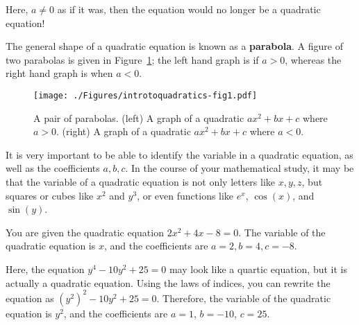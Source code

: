 \documentclass[
  12pt,
  a4paper, oneside]{starmastarticle}
\begin{document}
Here, \(a\neq 0\) as if it was, then the equation would no longer be a
quadratic equation!

The general shape of a quadratic equation is known as a
\textbf{parabola}. A figure of two parabolas is given in
Figure~\ref{fig-1}; the left hand graph is if \(a > 0\), whereas the
right hand graph is when \(a < 0\).

\begin{figure}

{\centering \texttt{[image: ./Figures/introtoquadratics-fig1.pdf]}

}

\caption{\label{fig-1}A pair of parabolas. (left) A graph of a quadratic
\(ax^2 + bx + c\) where \(a > 0\). (right) A graph of a quadratic
\(ax^2 + bx + c\) where \(a < 0\).}

\end{figure}

It is very important to be able to identify the variable in a quadratic
equation, as well as the coefficients \(a,b,c\). In the course of your
mathematical study, it may be that the variable of a quadratic equation
is not only letters like \(x,y,z\), but squares or cubes like \(x^2\)
and \(y^3\), or even functions like \(e^x\), \(\cos(x)\), and
\(\sin(y)\).

\begin{tcolorbox}[enhanced jigsaw, bottomrule=.15mm, colback=white, opacityback=0, rightrule=.15mm, breakable, left=2mm, arc=.35mm, toprule=.15mm, colframe=quarto-callout-note-color-frame, leftrule=.75mm]
\begin{minipage}[t]{5.5mm}
\textcolor{quarto-callout-note-color}{\faInfo}
\end{minipage}%
\begin{minipage}[t]{\textwidth - 5.5mm}
You are given the quadratic equation \(2x^2 + 4x - 8 = 0\). The variable
of the quadratic equation is \(x\), and the coefficients are
\(a = 2, b = 4, c = -8\).\end{minipage}%
\end{tcolorbox}

\begin{tcolorbox}[enhanced jigsaw, bottomrule=.15mm, colback=white, opacityback=0, rightrule=.15mm, breakable, left=2mm, arc=.35mm, toprule=.15mm, colframe=quarto-callout-note-color-frame, leftrule=.75mm]
\begin{minipage}[t]{5.5mm}
\textcolor{quarto-callout-note-color}{\faInfo}
\end{minipage}%
\begin{minipage}[t]{\textwidth - 5.5mm}
Here, the equation \(y^4 - 10y^2 + 25 = 0\) may look like a quartic
equation, but it is actually a quadratic equation. Using the laws of
indices, you can rewrite the equation as \((y^2)^2 - 10y^2 + 25 = 0\).
Therefore, the variable of the quadratic equation is \(y^2\), and the
coefficients are \(a = 1\), \(b = -10\), \(c = 25\).\end{minipage}%
\end{tcolorbox}
\end{document}
